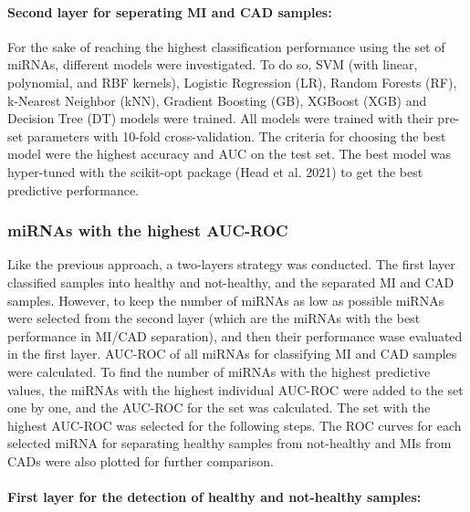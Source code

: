 \documentclass[smallextended]{svjour3}       %
\begin{document}
\hypertarget{second-layer-for-seperating-mi-and-cad-samples}{%
\paragraph{Second layer for seperating MI and CAD
samples:}\label{second-layer-for-seperating-mi-and-cad-samples}}

For the sake of reaching the highest classification performance using
the set of miRNAs, different models were investigated. To do so, SVM
(with linear, polynomial, and RBF kernels), Logistic Regression (LR),
Random Forests (RF), k-Nearest Neighbor (kNN), Gradient Boosting (GB),
XGBoost (XGB) and Decision Tree (DT) models were trained. All models
were trained with their pre-set parameters with 10-fold
cross-validation. The criteria for choosing the best model were the
highest accuracy and AUC on the test set. The best model was hyper-tuned
with the scikit-opt package (Head et al. 2021) to get the best
predictive performance.

\hypertarget{mirnas-with-the-highest-auc-roc}{%
\subsubsection{miRNAs with the highest
AUC-ROC}\label{mirnas-with-the-highest-auc-roc}}

Like the previous approach, a two-layers strategy was conducted. The
first layer classified samples into healthy and not-healthy, and the
separated MI and CAD samples. However, to keep the number of miRNAs as
low as possible miRNAs were selected from the second layer (which are
the miRNAs with the best performance in MI/CAD separation), and then
their performance wase evaluated in the first layer. AUC-ROC of all
miRNAs for classifying MI and CAD samples were calculated. To find the
number of miRNAs with the highest predictive values, the miRNAs with the
highest individual AUC-ROC were added to the set one by one, and the
AUC-ROC for the set was calculated. The set with the highest AUC-ROC was
selected for the following steps. The ROC curves for each selected miRNA
for separating healthy samples from not-healthy and MIs from CADs were
also plotted for further comparison.

\hypertarget{first-layer-for-the-detection-of-healthy-and-not-healthy-samples}{%
\paragraph{First layer for the detection of healthy and not-healthy
samples:}\label{first-layer-for-the-detection-of-healthy-and-not-healthy-samples}}
\end{document}
